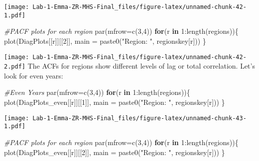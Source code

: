 \documentclass[
]{article}
\newenvironment{Shaded}{\begin{snugshade}}{\end{snugshade}}
\newcommand{\AttributeTok}[1]{\textcolor[rgb]{0.77,0.63,0.00}{#1}}
\newcommand{\CommentTok}[1]{\textcolor[rgb]{0.56,0.35,0.01}{\textit{#1}}}
\newcommand{\ControlFlowTok}[1]{\textcolor[rgb]{0.13,0.29,0.53}{\textbf{#1}}}
\newcommand{\DecValTok}[1]{\textcolor[rgb]{0.00,0.00,0.81}{#1}}
\newcommand{\FunctionTok}[1]{\textcolor[rgb]{0.00,0.00,0.00}{#1}}
\newcommand{\NormalTok}[1]{#1}
\newcommand{\SpecialCharTok}[1]{\textcolor[rgb]{0.00,0.00,0.00}{#1}}
\newcommand{\StringTok}[1]{\textcolor[rgb]{0.31,0.60,0.02}{#1}}
\begin{document}
\texttt{[image: Lab-1-Emma-ZR-MHS-Final\_files/figure-latex/unnamed-chunk-42-1.pdf]}

\begin{Shaded}
\begin{Highlighting}[]
\CommentTok{\#PACF plots for each region}
\FunctionTok{par}\NormalTok{(}\AttributeTok{mfrow=}\FunctionTok{c}\NormalTok{(}\DecValTok{3}\NormalTok{,}\DecValTok{4}\NormalTok{))}
\ControlFlowTok{for}\NormalTok{(r }\ControlFlowTok{in} \DecValTok{1}\SpecialCharTok{:}\FunctionTok{length}\NormalTok{(regions))\{}
  \FunctionTok{plot}\NormalTok{(DiagPlots[[r]][[}\DecValTok{2}\NormalTok{]], }\AttributeTok{main =} \FunctionTok{paste0}\NormalTok{(}\StringTok{"Region: "}\NormalTok{, regionskey[r]))}
\NormalTok{\}}
\end{Highlighting}
\end{Shaded}

\texttt{[image: Lab-1-Emma-ZR-MHS-Final\_files/figure-latex/unnamed-chunk-42-2.pdf]}
The ACFs for regions show different levels of lag or total correlation.
Let's look for even years:

\begin{Shaded}
\begin{Highlighting}[]
\CommentTok{\#Even Years }
\FunctionTok{par}\NormalTok{(}\AttributeTok{mfrow=}\FunctionTok{c}\NormalTok{(}\DecValTok{3}\NormalTok{,}\DecValTok{4}\NormalTok{))}
\ControlFlowTok{for}\NormalTok{(r }\ControlFlowTok{in} \DecValTok{1}\SpecialCharTok{:}\FunctionTok{length}\NormalTok{(regions))\{}
  \FunctionTok{plot}\NormalTok{(DiagPlots\_even[[r]][[}\DecValTok{1}\NormalTok{]], }\AttributeTok{main =} \FunctionTok{paste0}\NormalTok{(}\StringTok{"Region: "}\NormalTok{, regionskey[r]))}
\NormalTok{\}}
\end{Highlighting}
\end{Shaded}

\texttt{[image: Lab-1-Emma-ZR-MHS-Final\_files/figure-latex/unnamed-chunk-43-1.pdf]}

\begin{Shaded}
\begin{Highlighting}[]
\CommentTok{\#PACF plots for each region}
\FunctionTok{par}\NormalTok{(}\AttributeTok{mfrow=}\FunctionTok{c}\NormalTok{(}\DecValTok{3}\NormalTok{,}\DecValTok{4}\NormalTok{))}
\ControlFlowTok{for}\NormalTok{(r }\ControlFlowTok{in} \DecValTok{1}\SpecialCharTok{:}\FunctionTok{length}\NormalTok{(regions))\{}
  \FunctionTok{plot}\NormalTok{(DiagPlots\_even[[r]][[}\DecValTok{2}\NormalTok{]], }\AttributeTok{main =} \FunctionTok{paste0}\NormalTok{(}\StringTok{"Region: "}\NormalTok{, regionskey[r]))}
\NormalTok{\}}
\end{Highlighting}
\end{Shaded}
\end{document}
